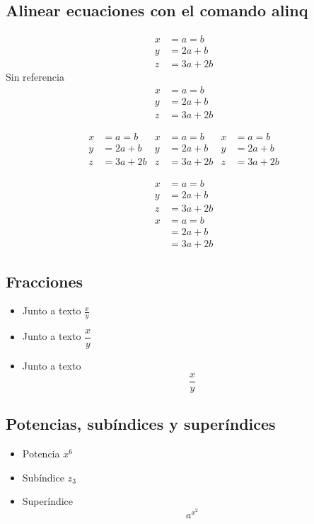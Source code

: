 \documentclass[12pt]{article}
\begin{document}
\subsection{Alinear ecuaciones con el comando alinq}
\begin{align}
x &= a = b\\
y &= 2a + b\\
z &= 3a + 2b
\end{align}
Sin referencia
\begin{align*}
x &= a = b\\
y &= 2a + b\\
z &= 3a + 2b
\end{align*}

\begin{align}
x &= a = b   & x &= a = b   & x &= a = b\\
y &= 2a + b  & y &= 2a + b  & y &= 2a + b\\
z &= 3a + 2b & z &= 3a + 2b & z &= 3a + 2b
\end{align}

\begin{align}
x &= a = b\\
y &= 2a + b\nonumber \\
z &= 3a + 2b \nonumber 
\end{align}
\begin{align}
x &= a = b\\
  &= 2a + b\nonumber \\
  &= 3a + 2b \nonumber 
\end{align}

\subsection{Fracciones}
\begin{itemize}
\item Junto a texto $ \frac{x}{y}$
\item Junto a texto $ \dfrac{x}{y}$
\item Junto a texto \[\frac{x}{y}\]
\end{itemize}

\subsection{Potencias, subíndices y superíndices}
\begin{itemize}
\item Potencia $ x^{6}$
\item Subíndice $z_{3}$
\item Superíndice \[a^{x^{2}}\]
\end{itemize}
\end{document}
